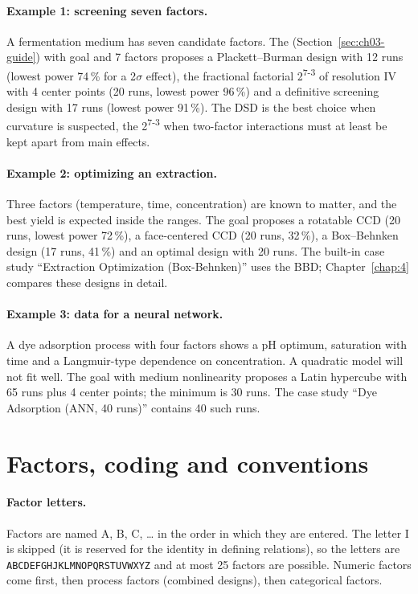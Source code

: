 \paragraph{Example 1: screening seven factors.} A fermentation medium has seven candidate factors. The
 (Section~\ref{sec:ch03-guide}) with goal  and 7 factors proposes a Plackett--Burman
design with 12 runs (lowest power 74\,\% for a 2$\sigma$ effect), the fractional factorial
2\textsuperscript{7-3} of resolution IV with 4 center points (20 runs, lowest power 96\,\%) and a definitive
screening design with 17 runs (lowest power 91\,\%). The DSD is the best choice when curvature is suspected, the
2\textsuperscript{7-3} when two-factor interactions must at least be kept apart from main effects.

\paragraph{Example 2: optimizing an extraction.} Three factors (temperature, time, concentration) are known to
matter, and the best yield is expected inside the ranges. The goal  proposes a rotatable CCD
(20 runs, lowest power 72\,\%), a face-centered CCD (20 runs, 32\,\%), a Box--Behnken design (17 runs, 41\,\%) and
an optimal design with 20 runs. The built-in case study ``Extraction Optimization (Box-Behnken)'' uses the BBD;
Chapter~\ref{chap:4} compares these designs in detail.

\paragraph{Example 3: data for a neural network.} A dye adsorption process with four factors shows a pH optimum,
saturation with time and a Langmuir-type dependence on concentration. A quadratic model will not fit well. The goal
 with medium nonlinearity proposes a Latin hypercube with 65 runs plus 4 center points; the
minimum is 30 runs. The case study ``Dye Adsorption (ANN, 40 runs)'' contains 40 such runs.

\section{Factors, coding and conventions}
\label{sec:ch03-coding}

\paragraph{Factor letters.} Factors are named A, B, C, \dots{} in the order in which they are entered. The letter I
is skipped (it is reserved for the identity in defining relations), so the letters are
\texttt{ABCDEFGHJKLMNOPQRSTUVWXYZ} and at most 25 factors are possible. Numeric factors come first, then process
factors (combined designs), then categorical factors.

